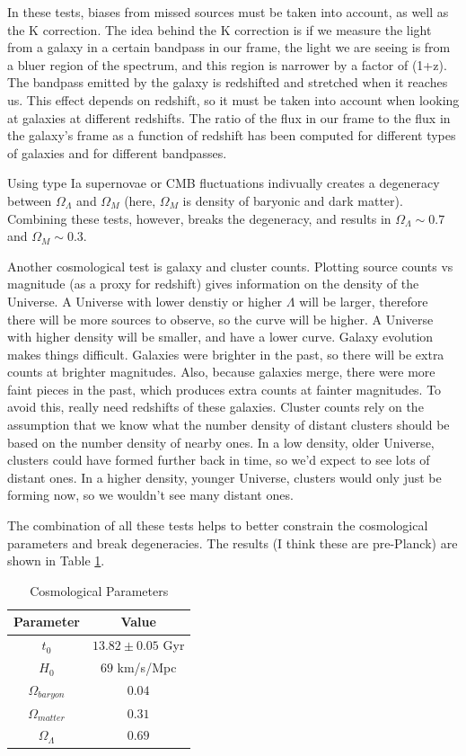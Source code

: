 In these tests, biases from missed sources must be taken into account, as well 
as the K correction.  The idea behind the K correction is if we measure the 
light from a galaxy in a certain bandpass in our frame, the light we are seeing 
is from a bluer region of the spectrum, and this region is narrower by a 
factor of (1+z).  The bandpass emitted by the galaxy is redshifted and 
stretched when it reaches us.  This effect depends on redshift, so it must be 
taken into account when looking at galaxies at different redshifts.  The 
ratio of the flux in our frame to the flux in the galaxy's frame as a function 
of redshift has been computed for different types of galaxies and for different 
bandpasses.  

Using type Ia supernovae or CMB fluctuations indivually creates a degeneracy 
between $\Omega_{\Lambda}$ and $\Omega_M$ (here, $\Omega_M$ is density of 
baryonic and dark matter).  Combining these tests, however, breaks the 
degeneracy, and results in $\Omega_{\Lambda}\sim0.7$ and $\Omega_M\sim0.3$.

Another cosmological test is galaxy and cluster counts.  Plotting 
source counts vs magnitude (as a proxy for redshift) gives information 
on the density of the Universe.  A Universe with lower denstiy or higher 
$\Lambda$ will be larger, therefore there will be more sources to observe, 
so the curve will be higher.  A Universe with higher density will be smaller, 
and have a lower curve.  Galaxy evolution makes things difficult.  Galaxies 
were brighter in the past, so there will be extra counts at brighter 
magnitudes.  Also, because galaxies merge, there were more faint pieces in 
the past, which produces extra counts at fainter magnitudes.  To avoid this, 
really need redshifts of these galaxies.  Cluster counts rely on the 
assumption that we know what the number density of distant clusters should 
be based on the number density of nearby ones.  In a low density, older 
Universe, clusters could have formed further back in time, so we'd expect 
to see lots of distant ones.  In a higher density, younger Universe, clusters 
would only just be forming now, so we wouldn't see many distant ones.  

The combination of all these tests helps to better constrain the cosmological 
parameters and break degeneracies.  The results (I think these are pre-Planck) 
are shown in Table \ref{tab:cosmo}.

\begin{table}[H]
\centering
\begin{tabular}{c c}
\hline\hline
Parameter&Value\\
\hline
$t_0$ & $13.82\pm0.05$ Gyr\\
$H_0$ & $69$ km/s/Mpc\\
$\Omega_{baryon}$ & $0.04$\\
$\Omega_{matter}$ & $0.31$\\
$\Omega_{\Lambda}$ & $0.69$\\
\hline
\end{tabular}
\caption{Cosmological Parameters \label{tab:cosmo}}
\end{table}

